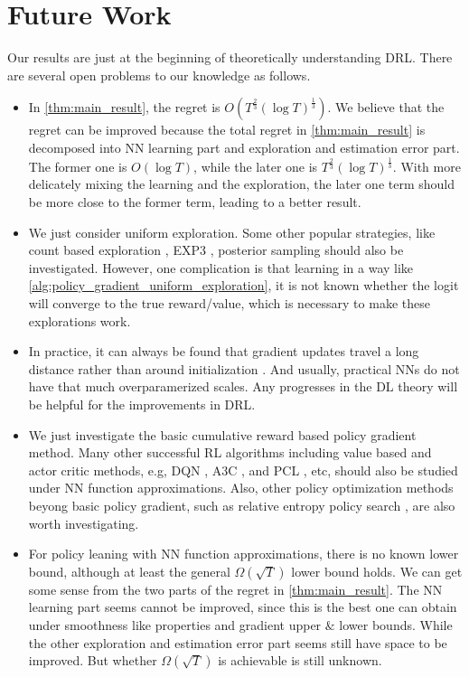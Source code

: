 \section{Future Work}
\label{sec:future_work}

Our results are just at the beginning of theoretically understanding DRL. There are several open problems to our knowledge as follows.
\begin{itemize}
    \item In \cref{thm:main_result}, the regret is $O\left( T^{\frac{2}{3} } \left(\log{T}\right)^{\frac{1}{3}}\right)$. We believe that the regret can be improved because the total regret in \cref{thm:main_result} is decomposed into NN learning part and exploration and estimation error part. The former one is $O\left(\log{T}\right)$, while the later one is $T^{\frac{2}{3} } \left(\log{T}\right)^{\frac{1}{3}}$. With more delicately mixing the learning and the exploration, the later one term should be more close to the former term, leading to a better result.
    \item We just consider uniform exploration. Some other popular strategies, like count based exploration \cite{auer2002finite}, EXP3 \citep{seldin2014one}, posterior sampling \citep{agrawal2012analysis} should also be investigated. However, one complication is that learning in a way like \cref{alg:policy_gradient_uniform_exploration}, it is not known whether the logit will converge to the true reward/value, which is necessary to make these explorations work.
    \item In practice, it can always be found that gradient updates travel a long distance rather than around initialization \citep{liu2018deeptracker}. And usually, practical NNs do not have that much overparamerized scales. Any progresses in the DL theory will be helpful for the  improvements in DRL.
    \item We just investigate the basic cumulative reward based policy gradient method. Many other successful RL algorithms including value based and actor critic methods, e.g, DQN \cite{mnih2015human}, A3C \citep{mnih2016asynchronous}, and PCL \citep{nachum2017bridging}, etc, should also be studied under NN function approximations. Also, other policy optimization methods beyong basic policy gradient, such as relative entropy policy search \citep{peters2010relative}, are also worth investigating.
    \item For policy leaning with NN function approximations, there is no known lower bound, although at least the general $\Omega\left(\sqrt{T}\right)$ lower bound holds. We can get some sense from the two parts of the regret in \cref{thm:main_result}. The NN learning part seems cannot be improved, since this is the best one can obtain under smoothness like properties and gradient upper $\&$ lower bounds. While the other exploration and estimation error part seems still have space to be improved. But whether $\Omega\left(\sqrt{T}\right)$ is achievable is still unknown.
\end{itemize}

\nocite{langley00}
\fi